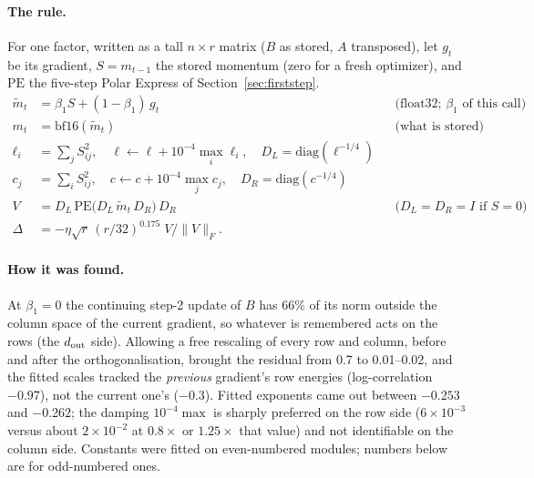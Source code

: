 \documentclass[11pt]{article}
\begin{document}
\paragraph{The rule.} For one factor, written as a tall $n\times r$ matrix ($B$ as stored,
$A$ transposed), let $g_t$ be its gradient, $S=m_{t-1}$ the stored momentum (zero for a fresh
optimizer), and $\mathrm{PE}$ the five-step Polar Express of Section~\ref{sec:firststep}.
\begin{align*}
\tilde m_t &= \beta_1 S+(1-\beta_1)\,g_t &&\text{(float32; $\beta_1$ of this call)}\\
m_t &= \mathrm{bf16}(\tilde m_t) &&\text{(what is stored)}\\
\ell_i &= \textstyle\sum_j S_{ij}^2,\quad \ell\leftarrow\ell+10^{-4}\max_i\ell_i,\quad D_L=\mathrm{diag}(\ell^{-1/4})\\
c_j &= \textstyle\sum_i S_{ij}^2,\quad c\leftarrow c+10^{-4}\max_j c_j,\quad D_R=\mathrm{diag}(c^{-1/4})\\
V &= D_L\,\mathrm{PE}\!\big(D_L\,\tilde m_t\,D_R\big)\,D_R &&\text{($D_L=D_R=I$ if $S=0$)}\\
\Delta &= -\eta\sqrt r\,(r/32)^{0.175}\;V/\|V\|_F .
\end{align*}

\paragraph{How it was found.} At $\beta_1=0$ the continuing step-2 update of $B$ has 66\% of
its norm outside the column space of the current gradient, so whatever is remembered acts on
the rows (the $d_{\rm out}$ side). Allowing a free rescaling of every row and column, before
and after the orthogonalisation, brought the residual from 0.7 to 0.01--0.02, and the fitted
scales tracked the \emph{previous} gradient's row energies (log-correlation $-0.97$), not the
current one's ($-0.3$). Fitted exponents came out between $-0.253$ and $-0.262$; the damping
$10^{-4}\max$ is sharply preferred on the row side ($6\times10^{-3}$ versus about
$2\times10^{-2}$ at $0.8\times$ or $1.25\times$ that value) and not identifiable on the column
side. Constants were fitted on even-numbered modules; numbers below are for odd-numbered ones.
\end{document}
